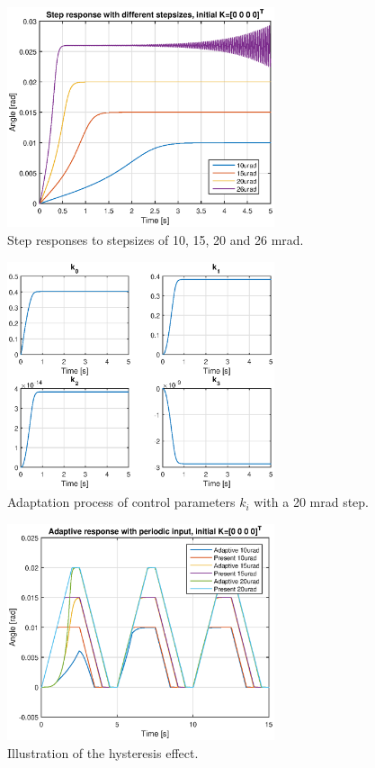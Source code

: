 \begin{figure}[h!]
  \centering
  \includegraphics[width=0.7\textwidth]{fig/matlab/stepresponse.eps}
  \caption{\label{fig:step_adaptive} Step responses to stepsizes of 10, 15, 20 and 26 mrad.}
\end{figure}

\begin{figure}[h!]
  \centering
  \includegraphics[width=0.7\textwidth]{fig/matlab/k.eps}
  \caption{\label{fig:hysteresis} Adaptation process of control parameters $k_i$ with a 20 mrad step.}
\end{figure}


\begin{figure}[h!]
  \centering
  \includegraphics[width=0.7\textwidth]{fig/matlab/periodicresponse.eps}
  \caption{\label{fig:periodic_resp}Illustration of the hysteresis effect.}
\end{figure}

